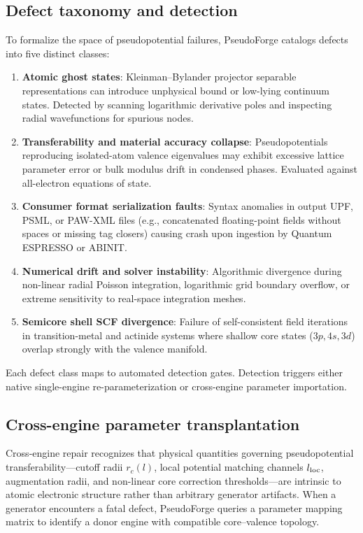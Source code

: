 \documentclass[3p,twocolumn]{elsarticle}
\begin{document}
\subsection{Defect taxonomy and detection}

To formalize the space of pseudopotential failures, PseudoForge catalogs defects into five distinct classes:
\begin{enumerate}\setlength{\itemsep}{1pt}\setlength{\parskip}{0pt}
\item \textbf{Atomic ghost states}: Kleinman--Bylander projector separable representations can introduce unphysical bound or low-lying continuum states. Detected by scanning logarithmic derivative poles and inspecting radial wavefunctions for spurious nodes.
\item \textbf{Transferability and material accuracy collapse}: Pseudopotentials reproducing isolated-atom valence eigenvalues may exhibit excessive lattice parameter error or bulk modulus drift in condensed phases. Evaluated against all-electron equations of state.
\item \textbf{Consumer format serialization faults}: Syntax anomalies in output UPF, PSML, or PAW-XML files (e.g., concatenated floating-point fields without spaces or missing tag closers) causing crash upon ingestion by Quantum ESPRESSO or ABINIT.
\item \textbf{Numerical drift and solver instability}: Algorithmic divergence during non-linear radial Poisson integration, logarithmic grid boundary overflow, or extreme sensitivity to real-space integration meshes.
\item \textbf{Semicore shell SCF divergence}: Failure of self-consistent field iterations in transition-metal and actinide systems where shallow core states ($3p, 4s, 3d$) overlap strongly with the valence manifold.
\end{enumerate}

Each defect class maps to automated detection gates. Detection triggers either native single-engine re-parameterization or cross-engine parameter importation.

\subsection{Cross-engine parameter transplantation}

Cross-engine repair recognizes that physical quantities governing pseudopotential transferability---cutoff radii $r_c(l)$, local potential matching channels $l_{\rm loc}$, augmentation radii, and non-linear core correction thresholds---are intrinsic to atomic electronic structure rather than arbitrary generator artifacts. When a generator encounters a fatal defect, PseudoForge queries a parameter mapping matrix to identify a donor engine with compatible core--valence topology.
\end{document}
